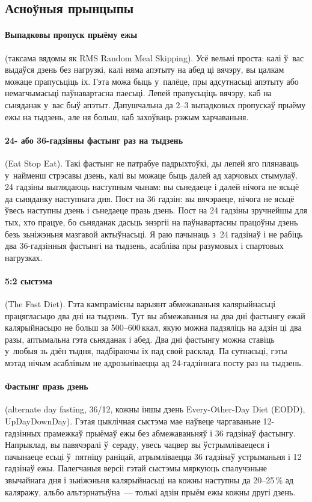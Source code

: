 \subsection{Асноўныя прынцыпы}

\paragraph{Выпадковы пропуск прыёму ежы} (таксама вядомы як RMS Random Meal Skipping).
Усё вельмі проста: калі ў~вас выдаўся дзень без нагрузкі, калі няма апэтыту на абед ці вячэру, вы цалкам можаце прапусьціць іх. Гэта можа быць у~палёце, пры адсутнасьці апэтыту або немагчымасьці паўнавартасна паесьці. Лепей прапусьціць вячэру, каб на сьняданак у~вас быў апэтыт. Дапушчальна да 2--3 выпадковых пропускаў прыёму ежы на тыдзень, але ня больш, каб захоўваць рэжым харчаваньня.

\paragraph{24- або 36-гадзінны фастынг раз на тыдзень} (Eat Stop Eat).
Такі фастынг не патрабуе падрыхтоўкі, ды лепей яго плянаваць у~найменш стрэсавы дзень, калі вы можаце быць далей ад харчовых стымулаў. 24 гадзіны выглядаюць наступным чынам: вы сьнедаеце і далей нічога не ясьцё да сьняданку наступнага дня. Пост на 36 гадзін: вы вячэраеце, нічога не ясьцё ўвесь наступны дзень і сьнедаеце празь дзень. Пост на 24 гадзіны зручнейшы для тых, хто працуе, бо сьняданак дасьць энэргіі на паўнавартасны працоўны дзень безь зьніжэньня мазгавой актыўнасьці. Я раю пачынаць з~24 гадзінаў і не рабіць два 36-гадзінныя фастынгі на тыдзень, асабліва пры разумовых і спартовых нагрузках.

\paragraph{5:2 сыстэма} (The Fast Diet).
Гэта кампрамісны варыянт абмежаваньня калярыйнасьці працягласьцю два дні на тыдзень. Тут вы абмежаваныя на два дні фастынгу ежай калярыйнасьцю не больш за 500--600\,ккал, якую можна падзяліць на адзін ці два разы, аптымальна гэта сьняданак і абед. Два дні фастынгу можна ставіць у~любыя зь дзён тыдня, падбіраючы іх пад свой расклад. Па сутнасьці, гэты мэтад нічым асаблівым не адрозьніваецца ад 24-гадзіннага посту раз на тыдзень.

\paragraph{Фастынг празь дзень} (alternate day fasting, 36/12, кожны іншы дзень Every-Other-Day Diet (EODD), UpDayDownDay).
Гэтая цыклічная сыстэма мае наўвеце чаргаваньне 12-гадзінных прамежкаў прыёмаў ежы без абмежаваньняў і 36 гадзінаў фастынгу. Напрыклад, вы павячэралі ў~сераду, увесь чацвер вы ўстрымліваецеся і пачынаеце есьці ў~пятніцу раніцай, атрымліваецца 36 гадзінаў устрыманьня і 12 гадзінаў ежы. Палегчаныя версіі гэтай сыстэмы мяркуюць спалучэньне звычайнага дня і зьніжэньня калярыйнасьці на кожны наступны да 20--25\,\% ад каляражу, альбо альтэрнатыўна~--- толькі адзін прыём ежы кожны другі дзень.

